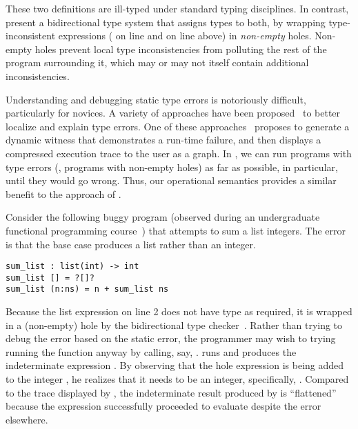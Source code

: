 \noindent
%
These two definitions are ill-typed under standard typing disciplines.
%
In contrast, \citet{popl-paper} present a bidirectional type system that assigns
types to both, by wrapping type-inconsistent expressions ( on line
 and  on line  above) in \emph{non-empty} holes.
%
Non-empty holes prevent local type inconsistencies from polluting the rest of
the program surrounding it, which may or may not itself contain additional
inconsistencies.

Understanding and debugging static type errors is notoriously difficult,
particularly for novices.
%
A variety of approaches have been
proposed~\cite{Seminal,ChenErwig2014,Pavlinovic2015,sherrloc} to better localize
and explain type errors.
%
One of these approaches~\cite{Seidel2016} proposes to generate a dynamic witness
that demonstrates a run-time failure, and then displays a compressed execution
trace to the user as a graph.
%
In \HazelnutLive{}, we can run programs with type errors (\ie{}, programs with
non-empty holes) as far as possible, in particular, until they
would go wrong.
%
Thus, our operational semantics provides a similar benefit to the approach of
\citet{Seidel2016}.

%
Consider the following buggy program (observed during an undergraduate
functional programming course~\cite{Seidel2016}) that attempts to sum a list
integers.
%
The error is that the base case produces a list rather than an integer.

\begin{lstlisting}
sum_list : list(int) -> int
sum_list [] = ?[]?
sum_list (n:ns) = n + sum_list ns
\end{lstlisting}

\noindent
%
Because the list expression on line 2 does not have type  as required,
it is wrapped in a (non-empty) hole by the bidirectional type
checker~\cite{popl-paper}.
%
Rather than trying to debug the error based on the static error, the programmer
may wish to trying running the function anyway by calling, say, .
%
\HazelnutLive{} runs and produces the indeterminate expression .
%
By observing that the hole expression is being added to the integer , he
realizes that it needs to be an integer, specifically, .
%
Compared to the trace displayed by \citet{Seidel2016}, the indeterminate result
produced by \HazelnutLive{} is ``flattened'' because the expression 
successfully proceeded to evaluate despite the error elsewhere.


